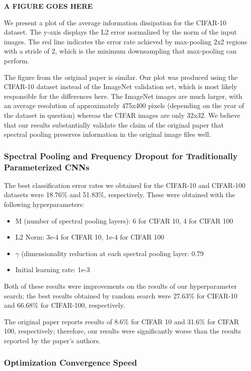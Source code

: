 \documentclass[10pt,journal,compsoc]{IEEEtran}
\begin{document}
\textbf{A FIGURE GOES HERE}

We present a plot of the average information dissipation for the CIFAR-10 dataset. The y-axis displays the L2 error normalized by the norm of the input images. The red line indicates the error rate achieved by max-pooling 2x2 regions with a stride of 2, which is the minimum downsampling that max-pooling can perform. 

The figure from the original paper is similar. Our plot was produced using the CIFAR-10 dataset instead of the ImageNet validation set, which is most likely responsible for the differences here. The ImageNet images are much larger, with an average resolution of approximately 475x400 pixels (depending on the year of the dataset in question) whereas the CIFAR images are only 32x32. We believe that our results substantially validate the claim of the original paper that spectral pooling preserves information in the original image files well.

\subsubsection{Spectral Pooling and Frequency Dropout for Traditionally Parameterized CNNs}

The best classification error rates we obtained for the CIFAR-10 and CIFAR-100 datasets were 18.76\% and 51.83\%, respectively. These were obtained with the following hyperparameters:

\begin{itemize}
\item M (number of spectral pooling layers): 6 for CIFAR 10, 4 for CIFAR 100
\item L2 Norm: 3e-4 for CIFAR 10, 1e-4 for CIFAR 100
\item $\gamma$ (dimensionality reduction at each spectral pooling layer: 0.79
\item Initial learning rate: 1e-3
\end{itemize}

Both of these results were improvements on the results of our hyperparameter search; the best results obtained by random search were 27.63\% for CIFAR-10 and 66.68\% for CIFAR-100, respectively.

The original paper reports results of 8.6\% for CIFAR 10 and 31.6\% for CIFAR 100, respectively; therefore, our results were significantly worse than the results reported by the paper's authors. 

\subsubsection{Optimization Convergence Speed}
\end{document}
